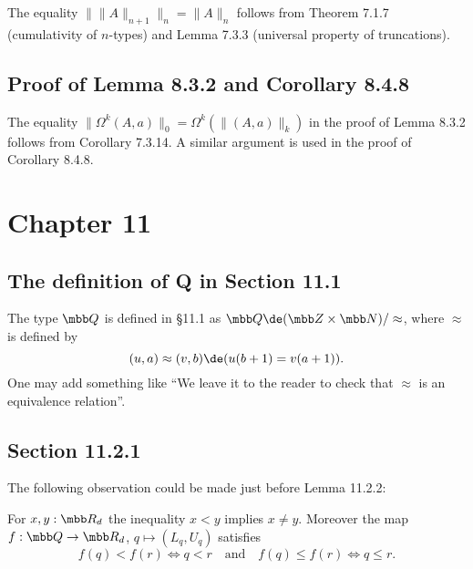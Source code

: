 \documentclass[12pt]{article}
\begin{document}
The equality $\lVert\lVert A\rVert_{n+1}\rVert_n=\lVert A\rVert_n$ follows from Theorem 7.1.7 (cumulativity of $n$-types) and Lemma 7.3.3 (universal property of truncations).


\subsection{Proof of Lemma 8.3.2 and Corollary 8.4.8}

The equality $\lVert\Omega^k(A,a)\rVert_0=\Omega^k(\lVert(A,a)\rVert_k)$ in the proof of Lemma 8.3.2 follows from Corollary 7.3.14. A similar argument is used in the proof of Corollary 8.4.8.


\section{Chapter 11}

\subsection{The definition of Q in Section 11.1}

The type $\mbb Q$ is defined in \S11.1 as $\mbb Q\de(\mbb Z\times\mbb N)/\approx$, where $\approx$ is defined by 
$$
(u,a)\approx(v,b)\de(u(b+1)=v(a+1)).
$$ 
One may add something like ``We leave it to the reader to check that $\approx$ is an equivalence relation''.


\subsection{Section 11.2.1}

The following observation could be made just before Lemma 11.2.2: 

For $x,y:\mbb R_d$ the inequality $x<y$ implies $x\neq y$. Moreover the map $f:\mbb Q\to\mbb R_d$, $q\mapsto(L_q,U_q)$ satisfies
$$
f(q)<f(r)\iff q<r\quad\text{and}\quad f(q)\le f(r)\iff q\le r.
$$ 



\end{document}
